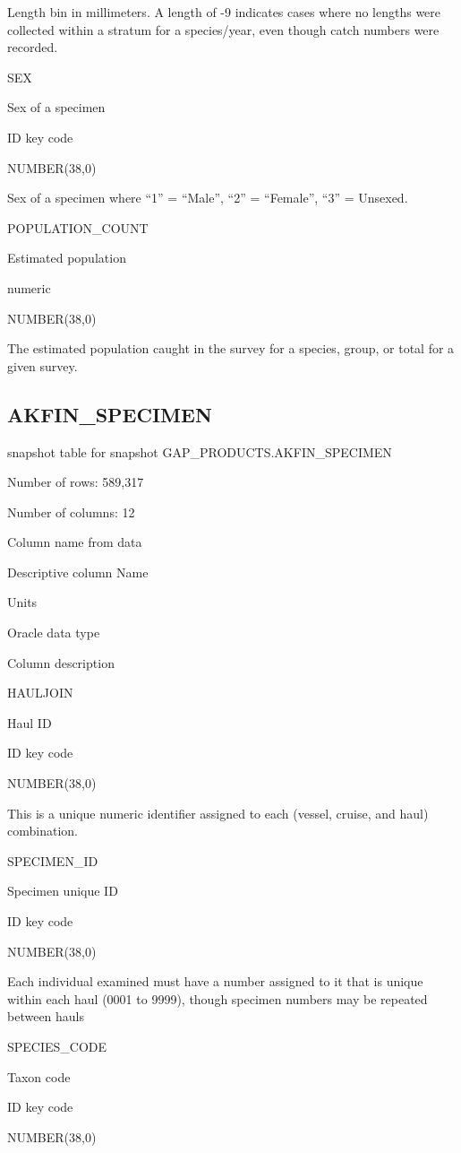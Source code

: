 \documentclass[
  letterpaper,
  oneside,
  open=any]{scrbook}
\begin{document}
Length bin in millimeters. A length of -9 indicates cases where no
lengths were collected within a stratum for a species/year, even though
catch numbers were recorded.

SEX

Sex of a specimen

ID key code

NUMBER(38,0)

Sex of a specimen where ``1'' = ``Male'', ``2'' = ``Female'', ``3'' =
Unsexed.

POPULATION\_COUNT

Estimated population

numeric

NUMBER(38,0)

The estimated population caught in the survey for a species, group, or
total for a given survey.

\subsection{AKFIN\_SPECIMEN}\label{akfin_specimen}

snapshot table for snapshot GAP\_PRODUCTS.AKFIN\_SPECIMEN

Number of rows: 589,317

Number of columns: 12

Column name from data

Descriptive column Name

Units

Oracle data type

Column description

HAULJOIN

Haul ID

ID key code

NUMBER(38,0)

This is a unique numeric identifier assigned to each (vessel, cruise,
and haul) combination.

SPECIMEN\_ID

Specimen unique ID

ID key code

NUMBER(38,0)

Each individual examined must have a number assigned to it that is
unique within each haul (0001 to 9999), though specimen numbers may be
repeated between hauls

SPECIES\_CODE

Taxon code

ID key code

NUMBER(38,0)
\end{document}
